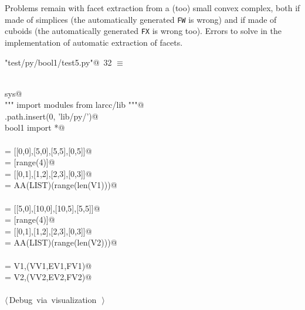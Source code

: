 \documentclass[11pt,oneside]{article}	%
\begin{document}
Problems remain with facet extraction from a (too) small convex complex, both if made of simplices
(the automatically generated \texttt{FW} is wrong) and if made of cuboids
(the automatically generated \texttt{FX} is wrong too). Errors to solve in the implementation of automatic extraction of facets.

\begin{flushleft} \small \label{scrap39}
\protect{}\verb@"test/py/bool1/test5.py"@\nobreak\ {\footnotesize 32 }$\equiv$
\vspace{-1ex}
\begin{list}{}{} \item
\mbox{}\verb@@\\
\mbox{}\verb@import sys@\\
\mbox{}\verb@""" import modules from larcc/lib """@\\
\mbox{}\verb@sys.path.insert(0, 'lib/py/')@\\
\mbox{}\verb@from bool1 import *@\\
\mbox{}\verb@@\\
\mbox{} = [[0,0],[5,0],[5,5],[0,5]]@\\
\mbox{} = [range(4)]@\\
\mbox{} = [[0,1],[1,2],[2,3],[0,3]]@\\
\mbox{} = AA(LIST)(range(len(V1)))@\\
\mbox{}\verb@@\\
\mbox{} = [[5,0],[10,0],[10,5],[5,5]]@\\
\mbox{} = [range(4)]@\\
\mbox{} = [[0,1],[1,2],[2,3],[0,3]]@\\
\mbox{} = AA(LIST)(range(len(V2)))@\\
\mbox{}\verb@@\\
\mbox{} = V1,(VV1,EV1,FV1)@\\
\mbox{} = V2,(VV2,EV2,FV2)@\\
\mbox{}\verb@@\\
\mbox{}\verb@@\hbox{$\langle\,$Debug via visualization\nobreak\ {\footnotesize {}}$\,\rangle$}\verb@@\\
\mbox{}\verb@@{\NWsep}
\end{list}
\vspace{-2ex}
\end{flushleft}
\end{document}

